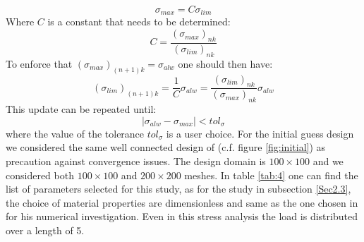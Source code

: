 \begin{equation}
\sigma_{max}=C\sigma_{lim}
\end{equation}  
Where $C$ is a constant that needs to be determined:
\begin{equation}
C=\frac{(\sigma_{max})_{nk}}{(\sigma_{lim})_{nk}}
\end{equation}
To enforce that $(\sigma_{max})_{(n+1)k}=\sigma_{alw}$ one should then have:
\begin{equation}
\label{eq.3.115}
(\sigma_{lim})_{(n+1)k}=\frac{1}{C}\sigma_{alw}=\frac{(\sigma_{lim})_{nk}}{(\sigma_{max})_{nk}}\sigma_{alw}
\end{equation}
This update can be repeated until:
\begin{equation}
\label{eq.3.116}
|\sigma_{alw}-\sigma_{max}|<tol_{\sigma}
\end{equation}
where the value of the tolerance $tol_{\sigma}$ is a user choice. 
For the initial guess design we considered the same well connected design of \cite{ZHANG20171} (c.f. figure \ref{fig:initial}) as precaution against convergence issues. 
The design domain is $100\times100$ and we considered both $100\times100$ and $200\times200$ meshes. In table \ref{tab:4} one can find the list of parameters selected for this study, as for the study in subsection \ref{Sec2.3}, the choice of material properties are dimensionless and same as the one chosen in \cite{verbart2017unified} for his numerical investigation. Even in this stress analysis the load is distributed over a length of 5.
